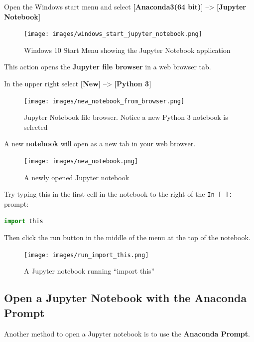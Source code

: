 \documentclass{book}
\begin{document}
Open the Windows start menu and select \textbf{{[}Anaconda3(64 bit){]}}
--\textgreater{} \textbf{{[}Jupyter Notebook{]}}

\begin{figure}
\centering
\texttt{[image: images/windows\_start\_jupyter\_notebook.png]}
\caption{Windows 10 Start Menu showing the Jupyter Notebook application}
\end{figure}

This action opens the \textbf{Jupyter file browser} in a web browser
tab.

In the upper right select \textbf{{[}New{]}} --\textgreater{}
\textbf{{[}Python 3{]}}

\begin{figure}
\centering
\texttt{[image: images/new\_notebook\_from\_browser.png]}
\caption{Jupyter Notebook file browser. Notice a new Python 3 notebook
is selected}
\end{figure}

A new \textbf{notebook} will open as a new tab in your web browser.

\begin{figure}
\centering
\texttt{[image: images/new\_notebook.png]}
\caption{A newly opened Jupyter notebook}
\end{figure}

Try typing this in the first cell in the notebook to the right of the
\lstinline!In [ ]:! prompt:

\begin{lstlisting}[language=Python]
import this
\end{lstlisting}

Then click the run button in the middle of the menu at the top of the
notebook.

\begin{figure}
\centering
\texttt{[image: images/run\_import\_this.png]}
\caption{A Jupyter notebook running ``import this''}
\end{figure}
    




    
        \subsection{Open a Jupyter Notebook with the Anaconda
Prompt}\label{open-a-jupyter-notebook-with-the-anaconda-prompt}
    




    
        Another method to open a Jupyter notebook is to use the \textbf{Anaconda
Prompt}.
\end{document}
